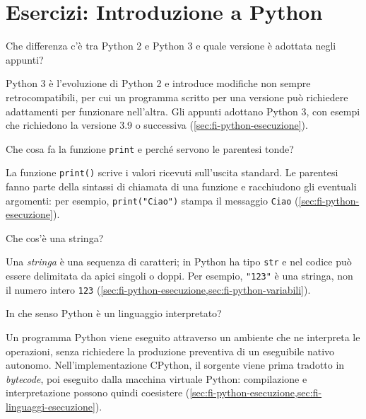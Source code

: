 \chapter{Esercizi: Introduzione a Python}
\label{chap:esercizi-introduzione-python}

\begin{exercise}
\label{ex:fi-python-versioni}
Che differenza c'è tra Python 2 e Python 3 e quale versione è
adottata negli appunti?
\end{exercise}

Python 3 è l'evoluzione di Python 2 e introduce modifiche non sempre
retrocompatibili, per cui un programma scritto per una versione può
richiedere adattamenti per funzionare nell'altra. Gli appunti adottano
Python 3, con esempi che richiedono la versione 3.9 o successiva
(\cref{sec:fi-python-esecuzione}).

\begin{exercise}
\label{ex:fi-python-print}
Che cosa fa la funzione \texttt{print} e perché servono le parentesi
tonde?
\end{exercise}

La funzione \texttt{print()} scrive i valori ricevuti sull'uscita standard.
Le parentesi fanno parte della sintassi di chiamata di una funzione e
racchiudono gli eventuali argomenti: per esempio,
\lstinline|print("Ciao")| stampa il messaggio \texttt{Ciao}
(\cref{sec:fi-python-esecuzione}).

\begin{exercise}
\label{ex:fi-python-stringa}
Che cos'è una stringa?
\end{exercise}

Una \emph{stringa} è una sequenza di caratteri; in Python ha tipo
\texttt{str} e nel codice può essere delimitata da apici singoli o doppi.
Per esempio, \lstinline|"123"| è una stringa, non il numero intero
\texttt{123} (\cref{sec:fi-python-esecuzione,sec:fi-python-variabili}).

\begin{exercise}
\label{ex:fi-python-interpretato}
In che senso Python è un linguaggio interpretato?
\end{exercise}

Un programma Python viene eseguito attraverso un ambiente che ne
interpreta le operazioni, senza richiedere la produzione preventiva di
un eseguibile nativo autonomo. Nell'implementazione CPython, il sorgente
viene prima tradotto in \emph{bytecode}, poi eseguito dalla macchina
virtuale Python: compilazione e interpretazione possono quindi coesistere
(\cref{sec:fi-python-esecuzione,sec:fi-linguaggi-esecuzione}).

